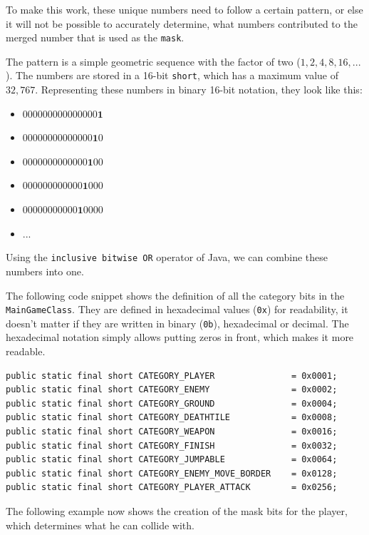 \documentclass[12p]{article}
\begin{document}
To make this work, these unique numbers need to follow a certain pattern, or else it will not be possible to accurately determine, what numbers contributed to the merged number that is used as the \texttt{mask}.

The pattern is a simple geometric sequence with the factor of two ($1, 2, 4, 8, 16, ...$). The numbers are stored in a 16-bit \texttt{short}, which has a maximum value of $32,767$. Representing these numbers in binary 16-bit notation, they look like this:

\begin{itemize}[leftmargin=*]
    \itemsep-0.75em 
    \item[] $000000000000000\mathbf{1}$
    \item[] $00000000000000\mathbf{1}0$
    \item[] $0000000000000\mathbf{1}00$
    \item[] $000000000000\mathbf{1}000$
    \item[] $00000000000\mathbf{1}0000$
    \item[] $...$
\end{itemize}

Using the \texttt{inclusive bitwise OR} operator \cite{bitwiseOROperator} of Java, we can combine these numbers into one.

The following code snippet shows the definition of all the category bits in the \texttt{MainGameClass}. They are defined in hexadecimal values (\texttt{0x}) for readability, it doesn't matter if they are written in binary (\texttt{0b}), hexadecimal or decimal. The hexadecimal notation simply allows putting zeros in front, which makes it more readable.

\begin{verbatim}
public static final short CATEGORY_PLAYER               = 0x0001;
public static final short CATEGORY_ENEMY                = 0x0002;
public static final short CATEGORY_GROUND               = 0x0004;
public static final short CATEGORY_DEATHTILE            = 0x0008;
public static final short CATEGORY_WEAPON               = 0x0016;
public static final short CATEGORY_FINISH               = 0x0032;
public static final short CATEGORY_JUMPABLE             = 0x0064;
public static final short CATEGORY_ENEMY_MOVE_BORDER    = 0x0128;
public static final short CATEGORY_PLAYER_ATTACK        = 0x0256;
\end{verbatim}

The following example now shows the creation of the mask bits for the player, which determines what he can collide with.
\end{document}
